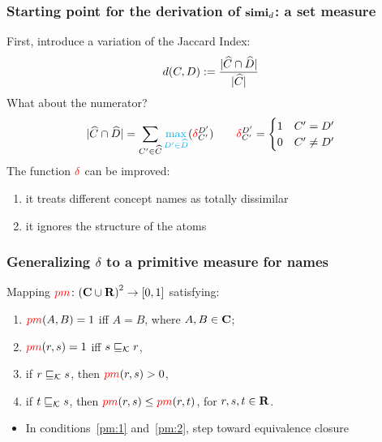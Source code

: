 \documentclass[smaller, dvipsnames]{beamer}
\begin{document}
\begin{frame}
  \frametitle{Starting point for the derivation of \(\operatorname{\mathbf{simi}}_d\): a set measure}
  First, introduce a variation of the \alert{Jaccard Index}:
  \begin{equation}
    d(C,D) := \frac{\abs{\atom{C} \cap \atom{D}}}%
                   {\abs{\atom{C}}}
  \end{equation}
  \onslide<+->
  What about the numerator?
  \begin{equation}
    \abs{\atom{C} \cap \atom{D}} =
    \sum_{C^\prime \in \atom{C}}%
      \textcolor{cyan}{\max_{D^\prime \in \atom{D}}}%
      (\mydelta_{C^\prime}^{D^\prime})
    \qquad \mydelta_{C^\prime}^{D^\prime}
    = \begin{cases}
      1 & C^\prime = D^\prime \\ 0 & C^\prime \ne D^\prime
    \end{cases}
  \end{equation}
  \onslide<+->
  The function \(\textcolor{red}{\delta}\) can be improved:
  \begin{enumerate}[<+->]
    \item it treats different concept names as totally dissimilar 
    \item it ignores the structure of the atoms
  \end{enumerate}
\end{frame}

\begin{frame}
  \frametitle{Generalizing \(\delta\) to a primitive measure for names}
  \begin{definition}
    Mapping \(\textcolor{red}{pm} \colon {(\mathbf{C}\cup \mathbf{R})}^2 \to [0,1]\)
    satisfying:
    \begin{enumerate}
      \item\label{pm:1} \(\textcolor{red}{pm}(A,B) = 1\) iff \(A = B\), where \(A,B \in \mathbf{C}\);
      \item\label{pm:2} \(\textcolor{red}{pm}(r,s) = 1\) iff \(s \sqsubseteq_{\mathcal{K}} r\),
      \item\label{pm:3} if \(r \sqsubseteq_{\mathcal{K}} s\), then \(\textcolor{red}{pm}(r,s) > 0\),
      \item\label{pm:4} if \(t \sqsubseteq_{\mathcal{K}} s\), then \(\textcolor{red}{pm}(r,s) \le \textcolor{red}{pm}(r,t)\), for \(r,s,t \in \mathbf{R}\).
    \end{enumerate}
  \end{definition}
  \onslide<+->
  \begin{itemize}%
    \item In conditions~\ref{pm:1} and~\ref{pm:2}, step toward \alert{equivalence closure}
  \end{itemize}
\end{frame}
\end{document}
